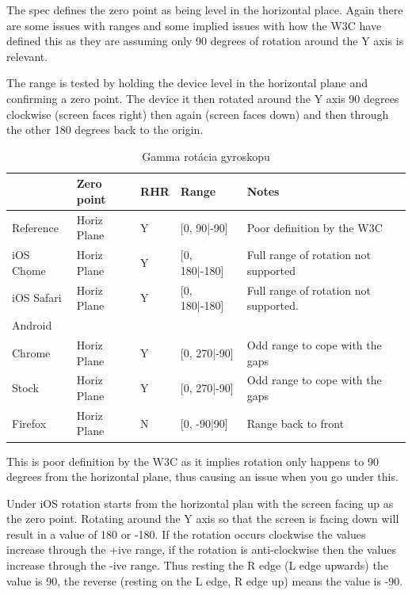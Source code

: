 The spec defines the zero point as being level in the horizontal place. Again there are some issues with ranges and some implied issues with how the W3C have defined this as they are assuming only 90 degrees of rotation around the Y axis is relevant.

The range is tested by holding the device level in the horizontal plane and confirming a zero point. The device it then rotated around the Y axis 90 degrees clockwise (screen faces right) then again (screen faces down) and then through the other 180 degrees back to the origin.

\begin{table}[H]
  \begin{tabular}{ | l | l | l | l | l |}
  \hline
              & Zero point    & RHR   & Range         & Notes\\ \hline
  Reference   & Horiz Plane   & Y     & [0, 90|-90]   & Poor definition by the W3C \\  
  iOS Chome   & Horiz Plane   & Y     & [0, 180|-180] & Full range of rotation not supported \\  
  iOS Safari  & Horiz Plane   & Y     & [0, 180|-180] & Full range of rotation not supported. \\  
  Android & & & & \\  
  Chrome      & Horiz Plane   & Y     & [0, 270|-90]  & Odd range to cope with the gaps \\  
  Stock       & Horiz Plane   & Y     & [0, 270|-90]  & Odd range to cope with the gaps \\  
  Firefox     & Horiz Plane   & N     & [0, -90|90]   & Range back to front \\
  \hline
  \end{tabular}
  \caption[Gamma rotácia gyroskopu]{Gamma rotácia gyroskopu}
\end{table}

This is poor definition by the W3C as it implies rotation only happens to 90 degrees from the horizontal plane, thus causing an issue when you go under this.

Under iOS rotation starts from the horizontal plan with the screen facing up as the zero point. Rotating around the Y axis so that the screen is facing down will result in a value of 180 or -180. If the rotation occurs clockwise the values increase through the +ive range, if the rotation is anti-clockwise then the values increase through the -ive range. Thus resting the R edge (L edge upwards) the value is 90, the reverse (resting on the L edge, R edge up) means the value is -90.

